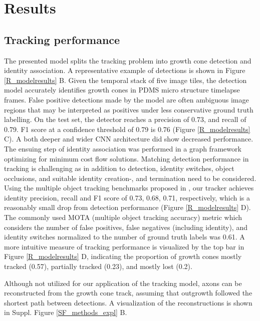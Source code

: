 \section{Results}
\subsection{Tracking performance}
The presented model splits the tracking problem into growth cone detection and
identity association. A representative example of detections is shown in Figure
\ref{R_modelresults} B. Given the temporal stack of five image tiles, the
detection model accurately identifies growth cones in PDMS micro structure
timelapse frames. False positive detections made by the model are often
ambiguous image regions that may be interpreted as positives under less
conservative ground truth labelling. On the test set, the detector reaches a
precision of 0.73, and recall of 0.79. F1 score at a confidence threshold of
0.79 is 0.76 (Figure \ref{R_modelresults} C). A both deeper and wider CNN
architecture did show decreased performance. The ensuing step of identity
association was performed in a graph framework optimizing for minimum cost flow
solutions. Matching detection performance in tracking is challenging as in
addition to detection, identity switches, object occlusions, and suitable
identity creation-, and termination need to be considered. Using the multiple
object tracking benchmarks proposed in \cite{mot_benchmark_2015}, our tracker
achieves identity precision, recall and F1 score of 0.73, 0.68, 0.71,
respectively, which is a reasonably small drop from detection performance
(Figure \ref{R_modelresults} D). The commonly used MOTA (multiple object
tracking accuracy) metric which considers the number of false positives, false
negatives (including identity), and identity switches normalized to the number
of ground truth labels was 0.61. A more intuitive measure of tracking
performance is visualized by the top bar in Figure \ref{R_modelresults} D,
indicating the proportion of growth cones mostly tracked (0.57), partially
tracked (0.23), and mostly lost (0.2). 

Although not utilized for our application of the tracking model, axons can be
reconstructed from the growth cone track, assuming that outgrowth followed the
shortest path between detections. A visualization of the reconstructions is
shown in Suppl. Figure \ref{SF_methods_expl} B.

